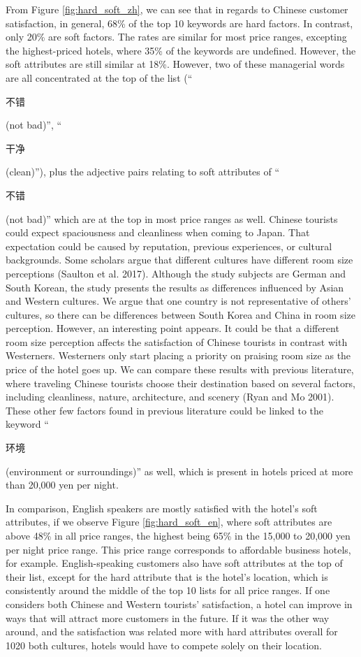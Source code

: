 \documentclass[smallextended,natbib]{svjour3}       %
\begin{document}
    From Figure \ref{fig:hard_soft_zh}, we can see that in regards to Chinese customer satisfaction, in general, 68\% of the top 10 keywords are hard factors. In contrast, only 20\% are soft factors. The rates are similar for most price ranges, excepting the highest-priced hotels, where 35\% of the keywords are undefined. However, the soft attributes are still similar at 18\%. However, two of these managerial words are all concentrated at the top of the list (``\begin{CJK}{UTF8}{gbsn}不错\end{CJK} (not bad)'', ``\begin{CJK}{UTF8}{gbsn}干净\end{CJK} (clean)''), plus the adjective pairs relating to soft attributes of ``\begin{CJK}{UTF8}{gbsn}不错\end{CJK} (not bad)'' which are at the top in most price ranges as well. Chinese tourists could expect spaciousness and cleanliness when coming to Japan. That expectation could be caused by reputation, previous experiences, or cultural backgrounds. Some scholars argue that different cultures have different room size perceptions (Saulton et al. 2017). Although the study subjects are German and South Korean, the study presents the results as differences influenced by Asian and Western cultures. We argue that one country is not representative of others’ cultures, so there can be differences between South Korea and China in room size perception. However, an interesting point appears. It could be that a different room size perception affects the satisfaction of Chinese tourists in contrast with Westerners. Westerners only start placing a priority on praising room size as the price of the hotel goes up. We can compare these results with previous literature, where traveling Chinese tourists choose their destination based on several factors, including cleanliness, nature, architecture, and scenery (Ryan and Mo 2001). These other few factors found in previous literature could be linked to the keyword ``\begin{CJK}{UTF8}{gbsn}环境\end{CJK} (environment or surroundings)'' as well, which is present in hotels priced at more than 20,000 yen per night. 

    In comparison, English speakers are mostly satisfied with the hotel's soft attributes, if we observe Figure \ref{fig:hard_soft_en}, where soft attributes are above 48\% in all price ranges, the highest being 65\% in the 15,000 to 20,000 yen per night price range. This price range corresponds to affordable business hotels, for example. English-speaking customers also have soft attributes at the top of their list, except for the hard attribute that is the hotel's location, which is consistently around the middle of the top 10 lists for all price ranges. If one considers both Chinese and Western tourists’ satisfaction, a hotel can improve in ways that will attract more customers in the future. If it was the other way around, and the satisfaction was related more with hard attributes overall for 1020 both cultures, hotels would have to compete solely on their location.
\end{document}
